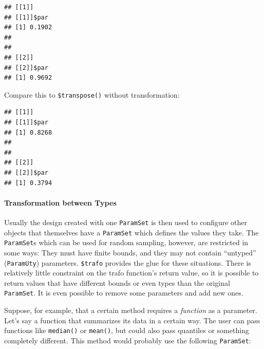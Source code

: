 \documentclass[]{article}
\newenvironment{Shaded}{\begin{snugshade}}{\end{snugshade}}
\newcommand{\ControlFlowTok}[1]{\textcolor[rgb]{0.13,0.29,0.53}{\textbf{#1}}}
\newcommand{\DataTypeTok}[1]{\textcolor[rgb]{0.13,0.29,0.53}{#1}}
\newcommand{\DecValTok}[1]{\textcolor[rgb]{0.00,0.00,0.81}{#1}}
\newcommand{\KeywordTok}[1]{\textcolor[rgb]{0.13,0.29,0.53}{\textbf{#1}}}
\newcommand{\NormalTok}[1]{#1}
\newcommand{\OperatorTok}[1]{\textcolor[rgb]{0.81,0.36,0.00}{\textbf{#1}}}
\newcommand{\OtherTok}[1]{\textcolor[rgb]{0.56,0.35,0.01}{#1}}
\newcommand{\StringTok}[1]{\textcolor[rgb]{0.31,0.60,0.02}{#1}}
\let\oldparagraph\paragraph
\renewcommand{\paragraph}[1]{\oldparagraph{#1}\mbox{}}
\renewenvironment{Shaded} {\begin{snugshade}\small} {\end{snugshade}}
\begin{document}
\begin{verbatim}
## [[1]]
## [[1]]$par
## [1] 0.1902
## 
## 
## [[2]]
## [[2]]$par
## [1] 0.9692
\end{verbatim}

Compare this to \texttt{\$transpose()} without transformation:

\begin{Shaded}
\end{Shaded}

\begin{verbatim}
## [[1]]
## [[1]]$par
## [1] 0.8268
## 
## 
## [[2]]
## [[2]]$par
## [1] 0.3794
\end{verbatim}

\hypertarget{transformation-between-types}{%
\paragraph{Transformation between Types}\label{transformation-between-types}}

Usually the design created with one \texttt{ParamSet} is then used to configure other objects that themselves have a \texttt{ParamSet} which defines the values they take.
The \texttt{ParamSet}s which can be used for random sampling, however, are restricted in some ways:
They must have finite bounds, and they may not contain ``untyped'' (\texttt{ParamUty}) parameters.
\texttt{\$trafo} provides the glue for these situations.
There is relatively little constraint on the trafo function's return value, so it is possible to return values that have different bounds or even types than the original \texttt{ParamSet}.
It is even possible to remove some parameters and add new ones.

Suppose, for example, that a certain method requires a \emph{function} as a parameter.
Let's say a function that summarizes its data in a certain way.
The user can pass functions like \texttt{median()} or \texttt{mean()}, but could also pass quantiles or something completely different.
This method would probably use the following \texttt{ParamSet}:

\begin{Shaded}
\end{Shaded}
\end{document}

